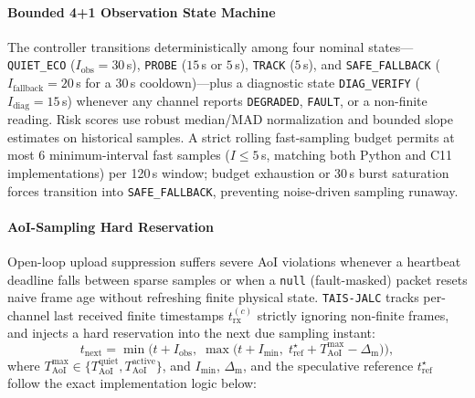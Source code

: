 \documentclass[journal,twoside,web]{ieeecolor}
\begin{document}
\paragraph{Bounded 4+1 Observation State Machine}
The controller transitions deterministically among four nominal states---\texttt{QUIET\_ECO} ($I_{\text{obs}}{=}30$\,s), \texttt{PROBE} ($15$\,s or $5$\,s), \texttt{TRACK} ($5$\,s), and \texttt{SAFE\_FALLBACK} ($I_{\text{fallback}}{=}20$\,s for a 30\,s cooldown)---plus a diagnostic state \texttt{DIAG\_VERIFY} ($I_{\text{diag}}{=}15$\,s) whenever any channel reports \texttt{DEGRADED}, \texttt{FAULT}, or a non-finite reading. Risk scores use robust median/MAD normalization and bounded slope estimates on historical samples. A strict rolling fast-sampling budget permits at most 6 minimum-interval fast samples ($I{\le}5$\,s, matching both Python and C11 implementations) per 120\,s window; budget exhaustion or 30\,s burst saturation forces transition into \texttt{SAFE\_FALLBACK}, preventing noise-driven sampling runaway.

\paragraph{AoI-Sampling Hard Reservation}
Open-loop upload suppression suffers severe AoI violations whenever a heartbeat deadline falls between sparse samples or when a \texttt{null} (fault-masked) packet resets naive frame age without refreshing finite physical state. \texttt{TAIS-JALC} tracks per-channel last received finite timestamps $t_{\text{rx}}^{(c)}$ strictly ignoring non-finite frames, and injects a hard reservation into the next due sampling instant:
\begin{equation}
t_{\text{next}} = \min\!\Big(t + I_{\text{obs}},\; \max\!\big(t + I_{\min},\; t_{\text{ref}}^{\star} + T_{\text{AoI}}^{\max} - \Delta_{\text{m}}\big)\Big),
\label{eq:aoi_reserve}
\end{equation}
where $T_{\text{AoI}}^{\max} \in \{T_{\text{AoI}}^{\text{quiet}}, T_{\text{AoI}}^{\text{active}}\}$, and $I_{\min}$, $\Delta_{\text{m}}$, and the speculative reference $t_{\text{ref}}^{\star}$ follow the exact implementation logic below:

\vspace{2pt}
{\setlength{\fboxrule}{0.4pt}\setlength{\fboxsep}{3pt}\noindent{}}
\vspace{2pt}
\end{document}
